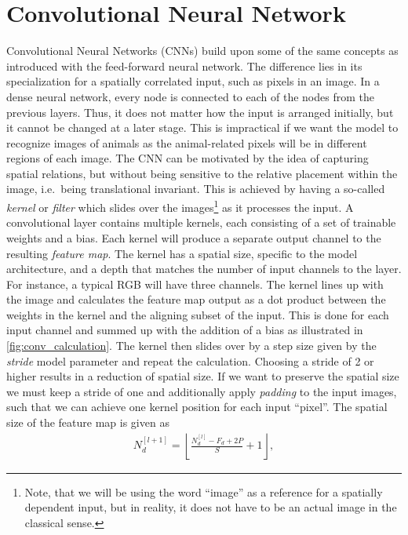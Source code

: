 \section{Convolutional Neural Network}
Convolutional Neural Networks (\acrshort{CNN}s) build upon some of the same
concepts as introduced with the feed-forward neural network. The difference lies
in its specialization for a spatially correlated input, such as pixels in an
image. In a dense neural network, every node is connected to each of the nodes
from the previous layers. Thus, it does not matter how the input is arranged
initially, but it cannot be changed at a later stage. This is
impractical if we want the model to recognize images of animals as the
animal-related pixels will be in different regions of each image. The
\acrshort{CNN} can be motivated by the idea of capturing spatial relations, but without being sensitive to the relative placement within the image, i.e.\ being
translational invariant. This is achieved by having a so-called \textit{kernel}
or \textit{filter} which slides over the images\footnote{Note,
that we will be using the word ``image'' as a reference for a spatially
dependent input, but in reality, it does not have to be an actual image in the
classical sense.} as it processes the input. A convolutional layer contains multiple kernels, each
consisting of a set of trainable weights and a bias. Each kernel will produce a separate output channel to the resulting \textit{feature map}. The kernel has a spatial size, specific to the model architecture, and a depth that matches the number of input channels to the layer. For instance, a typical RGB will have three channels. The kernel lines up with the image and calculates the feature map output as a dot product between the weights in the kernel and the aligning subset of the input. This is done for each input channel and summed up with the addition of a bias as illustrated in \cref{fig:conv_calculation}. The kernel then slides over by a step size given by the \textit{stride} model parameter and repeat the calculation. Choosing a stride of 2 or higher results in a reduction of spatial size. If we want to preserve the spatial size we must keep a stride of one and
additionally apply \textit{padding} to the input images, such that we can
achieve one kernel position for each input ``pixel''. The spatial size of the
feature map is given as
\begin{align}
  N_d^{[l+1]} = \left\lfloor \frac{N_d^{[l]} - F_d + 2P}{S} + 1 \right\rfloor,
  \label{eq:down_scaling}
\end{align}

